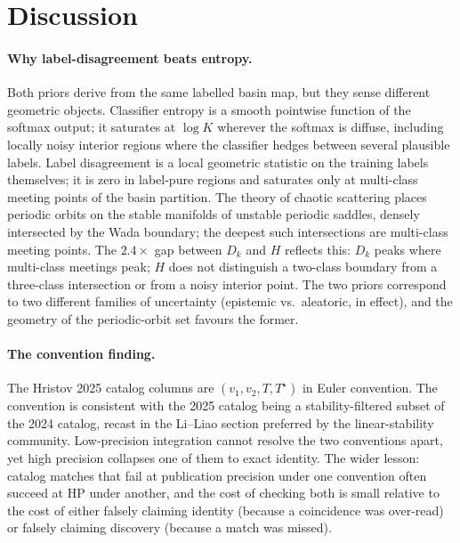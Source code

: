 \documentclass[10pt]{article}
\newcommand{\Tstar}{T^{\star}}
\begin{document}
\section{Discussion}

\paragraph{Why label-disagreement beats entropy.}
Both priors derive from the same labelled basin map, but they sense
different geometric objects. Classifier entropy is a smooth pointwise
function of the softmax output; it saturates at $\log K$ wherever the
softmax is diffuse, including locally noisy interior regions where
the classifier hedges between several plausible labels. Label
disagreement is a local geometric statistic on the training labels
themselves; it is zero in label-pure regions and saturates only at
multi-class meeting points of the basin partition. The theory of
chaotic scattering \citep{GOY1983, MGOY1985, NusseYorke1992, Poon1996}
places periodic orbits on the stable manifolds of unstable periodic
saddles, densely intersected by the Wada boundary; the deepest such
intersections are multi-class meeting points. The $2.4\times$ gap
between $D_k$ and $H$ reflects this: $D_k$ peaks where multi-class
meetings peak; $H$ does not distinguish a two-class boundary from a
three-class intersection or from a noisy interior point. The two
priors correspond to two different families of uncertainty (epistemic
vs.\ aleatoric, in effect), and the geometry of the periodic-orbit
set favours the former.

\paragraph{The convention finding.}
The Hristov 2025 catalog columns are $(v_1, v_2, T, \Tstar)$ in Euler
convention. The convention is consistent with the 2025 catalog being
a stability-filtered subset of the 2024 catalog, recast in the
Li--Liao section preferred by the linear-stability community.
Low-precision integration cannot resolve the two conventions apart,
yet high precision collapses one of them to exact identity. The wider
lesson: catalog matches that fail at publication
precision under one convention often succeed at HP under another, and
the cost of checking both is small relative to the cost of either
falsely claiming identity (because a coincidence was over-read) or
falsely claiming discovery (because a match was missed).
\end{document}
